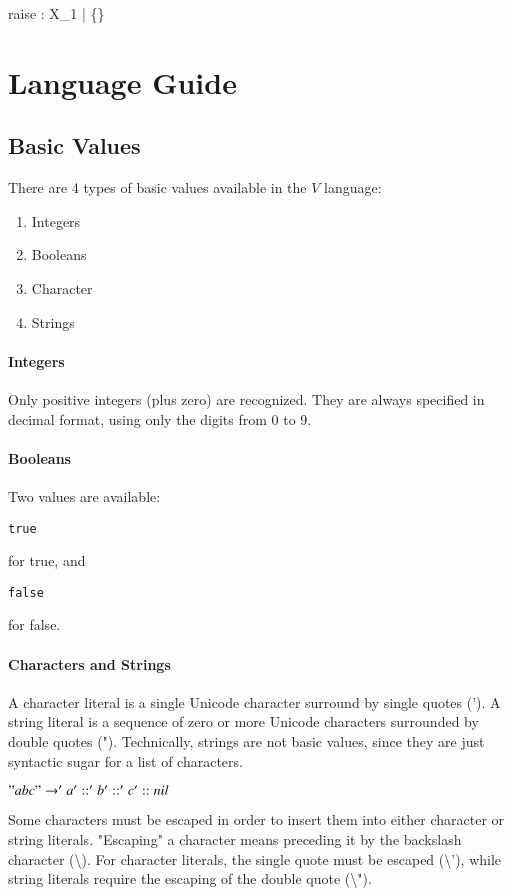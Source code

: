 \documentclass{article}
\def\code#1{\begin{footnotesize}\texttt{#1}\end{footnotesize}}
\begin{document}
\bigskip

    {\Gamma \vdash raise : X_1 \; | \; \{\}}

\newpage

\section{Language Guide}

\subsection{Basic Values}

There are 4 types of basic values available in the $V$ language:

\begin{enumerate}
  \item Integers
  \item Booleans
  \item Character
  \item Strings
\end{enumerate}

\paragraph{Integers}
Only positive integers (plus zero) are recognized.
They are always specified in decimal format,  using only the digits from 0 to 9.

\paragraph{Booleans}
Two values are available: \code{true} for true, and \code{false} for false.

\paragraph{Characters and Strings}
A character literal is a single Unicode character surround by single quotes (').
A string literal is a sequence of zero or more Unicode characters surrounded by double quotes (").
Technically, strings are not basic values, since they are just syntactic sugar for a list of characters.

$"abc" \rightarrow 'a' :: 'b' :: 'c' :: nil$

\bigskip

Some characters must be escaped in order to insert them into either character or string literals.
"Escaping" a character means preceding it by the backslash character (\textbackslash).
For character literals, the single quote must be escaped (\textbackslash'), while string literals require the escaping of the double quote (\textbackslash").
\end{document}
